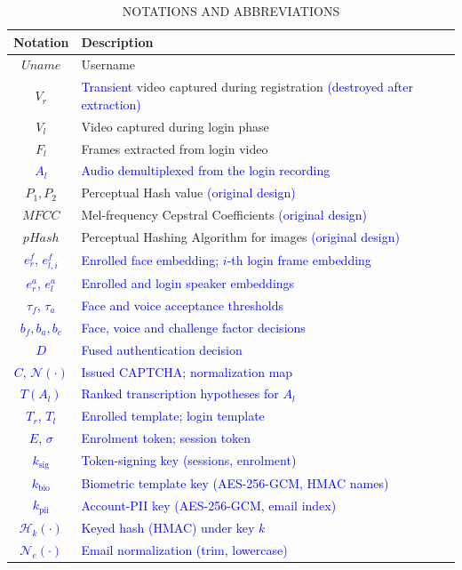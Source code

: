 \documentclass[10pt,journal,compsoc]{IEEEtran}
\begin{document}
\begin{table}
\caption{NOTATIONS AND ABBREVIATIONS}
\label{tab:notations}
\begin{tabular}{|c|l|}
\hline
\textbf{Notation} & \textbf{Description} \\ \hline
$Uname$ & Username \\
$V_r$ & \textcolor{blue}{Transient} video captured during registration \textcolor{blue}{(destroyed after extraction)} \\
$V_l$ & Video captured during login phase \\
$F_l$ & Frames extracted from login video  \\
\textcolor{blue}{$A_l$} & \textcolor{blue}{Audio demultiplexed from the login recording}\\
$P_1,P_2$ & Perceptual Hash value \textcolor{blue}{(original design)}\\
$MFCC$ &  Mel-frequency Cepstral Coefficients \textcolor{blue}{(original design)} \\
$pHash$ & Perceptual Hashing Algorithm for images \textcolor{blue}{(original design)}\\
\textcolor{blue}{$e^{f}_r$, $e^{f}_{l,i}$} & \textcolor{blue}{Enrolled face embedding; $i$-th login frame embedding}\\
\textcolor{blue}{$e^{a}_r$, $e^{a}_l$} & \textcolor{blue}{Enrolled and login speaker embeddings}\\
\textcolor{blue}{$\tau_f$, $\tau_a$} & \textcolor{blue}{Face and voice acceptance thresholds}\\
\textcolor{blue}{$b_f,b_a,b_c$} & \textcolor{blue}{Face, voice and challenge factor decisions}\\
\textcolor{blue}{$D$} & \textcolor{blue}{Fused authentication decision}\\
\textcolor{blue}{$C$, $\mathcal{N}(\cdot)$} & \textcolor{blue}{Issued CAPTCHA; normalization map}\\
\textcolor{blue}{$T(A_l)$} & \textcolor{blue}{Ranked transcription hypotheses for $A_l$}\\
\textcolor{blue}{$T_r$, $T_l$} & \textcolor{blue}{Enrolled template; login template}\\
\textcolor{blue}{$E$, $\sigma$} & \textcolor{blue}{Enrolment token; session token}\\
\textcolor{blue}{$k_{\text{sig}}$} & \textcolor{blue}{Token-signing key (sessions, enrolment)}\\
\textcolor{blue}{$k_{\text{bio}}$} & \textcolor{blue}{Biometric template key (AES-256-GCM, HMAC names)}\\
\textcolor{blue}{$k_{\text{pii}}$} & \textcolor{blue}{Account-PII key (AES-256-GCM, email index)}\\
\textcolor{blue}{$\mathcal{H}_{k}(\cdot)$} & \textcolor{blue}{Keyed hash (HMAC) under key $k$}\\
\textcolor{blue}{$\mathcal{N}_e(\cdot)$} & \textcolor{blue}{Email normalization (trim, lowercase)}\\
\hline
\end{tabular}
\end{table}
\end{document}
